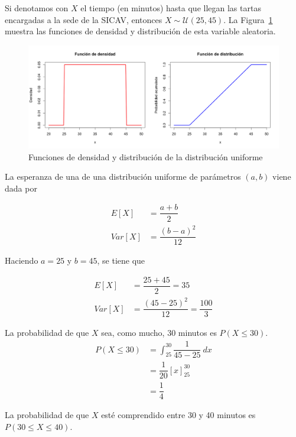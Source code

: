 \documentclass[12pt,a4paper,twoside,openright,titlepage,final]{article}
\begin{document}
Si denotamos con $X$ el tiempo (en minutos) hasta que llegan las tartas encargadas a la sede de la SICAV, entonces $X \sim \mathcal{U}(25,45)$. La Figura~\ref{fig:funcion_distribucion_uniforme} muestra las funciones de densidad y distribución de esta variable aleatoria.\\


\begin{figure}[tbph!]
\centering
\includegraphics[width=0.9\linewidth]{imagenes/funcion_distribucion_uniforme}
\caption{Funciones de densidad y distribución de la distribución uniforme}
\label{fig:funcion_distribucion_uniforme}
\end{figure}

La esperanza de una de una distribución uniforme de parámetros $(a, b)$ viene dada por

\begin{align*}
E[X] & = \dfrac{a + b}{2}\\
Var[X] & = \dfrac{(b-a)^2}{12}
\end{align*}

Haciendo $a = 25$ y $b = 45$, se tiene que

\begin{align*}
E[X] & = \dfrac{25+45}{2} = 35\\
Var[X] & = \dfrac{(45-25)^2}{12} = \dfrac{100}{3}
\end{align*}

La probabilidad de que $X$ sea, como mucho, 30 minutos es $P(X \leq 30)$.\\

\begin{align*}
P(X \leq 30) & = \int_{25}^{30} \dfrac{1}{45 -25} \ dx \\
& = \dfrac{1}{20}\left[x\right]_{25}^{30} \\ & = \dfrac{1}{4}
\end{align*}

La probabilidad de que $X$ esté comprendido entre 30 y 40 minutos es $P(30 \leq X \leq 40)$.\\
\end{document}
